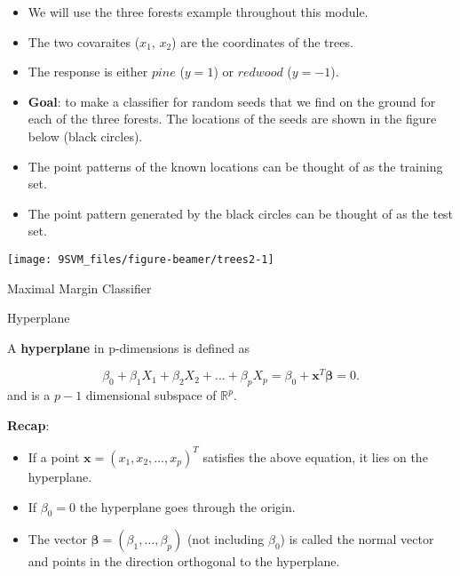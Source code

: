 \documentclass[10pt,ignorenonframetext,]{beamer}
\begin{document}
\begin{frame}

\begin{itemize}
\item
  We will use the three forests example throughout this module.
\item
  The two covaraites (\(x_1\), \(x_2\)) are the coordinates of the
  trees.
\item
  The response is either \(pine\) (\(y=1\)) or \(redwood\) (\(y=-1\)).
\item
  \textbf{Goal}: to make a classifier for random seeds that we find on
  the ground for each of the three forests. The locations of the seeds
  are shown in the figure below (black circles).
\end{itemize}

\end{frame}

\begin{frame}

\begin{itemize}
\item
  The point patterns of the known locations can be thought of as the
  training set.
\item
  The point pattern generated by the black circles can be thought of as
  the test set.
\end{itemize}

\begin{center}\texttt{[image: 9SVM\_files/figure-beamer/trees2-1]} \end{center}

\end{frame}

\begin{frame}{Maximal Margin Classifier}

\begin{block}{Hyperplane}

\vspace{2mm}

A \textbf{hyperplane} in p-dimensions is defined as

\[\beta_0+\beta_1 X_1 + \beta_2 X_2 +...+\beta_p X_p=\beta_0+{\boldsymbol x}^T {\boldsymbol \beta}=0.\]
and is a \(p-1\) dimensional subspace of \(\mathbb{R}^p\). \vspace{3mm}

\textbf{Recap}:

\begin{itemize}
\item
  If a point \({\boldsymbol x}=(x_1,x_2,...,x_p)^T\) satisfies the above
  equation, it lies on the hyperplane.
\item
  If \(\beta_0=0\) the hyperplane goes through the origin.
\item
  The vector \({\boldsymbol \beta}=(\beta_1, \ldots, \beta_p)\) (not
  including \(\beta_0\)) is called the normal vector and points in the
  direction orthogonal to the hyperplane.
\end{itemize}

\end{block}

\end{frame}
\end{document}

